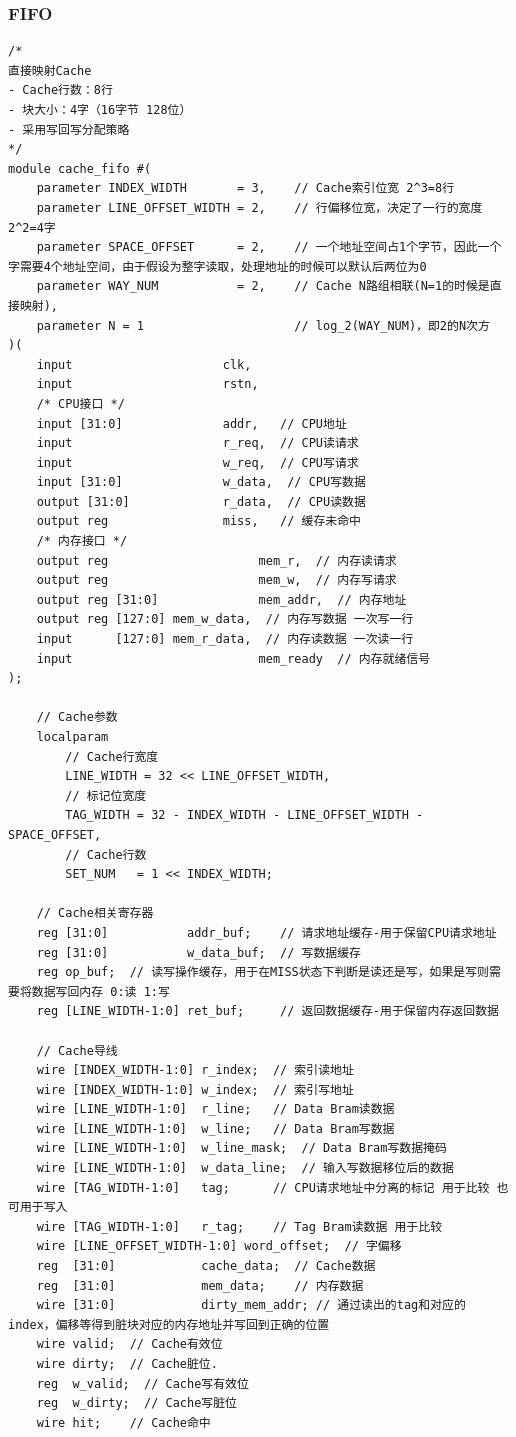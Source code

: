 \documentclass[12pt,a4paper]{ctexart}
\begin{document}
\subsubsection{FIFO}
\begin{lstlisting}[style=verilog]
/*
直接映射Cache
- Cache行数：8行
- 块大小：4字（16字节 128位）
- 采用写回写分配策略
*/
module cache_fifo #(
    parameter INDEX_WIDTH       = 3,    // Cache索引位宽 2^3=8行
    parameter LINE_OFFSET_WIDTH = 2,    // 行偏移位宽，决定了一行的宽度 2^2=4字
    parameter SPACE_OFFSET      = 2,    // 一个地址空间占1个字节，因此一个字需要4个地址空间，由于假设为整字读取，处理地址的时候可以默认后两位为0
    parameter WAY_NUM           = 2,    // Cache N路组相联(N=1的时候是直接映射),
    parameter N = 1                     // log_2(WAY_NUM)，即2的N次方
)(
    input                     clk,    
    input                     rstn,
    /* CPU接口 */  
    input [31:0]              addr,   // CPU地址
    input                     r_req,  // CPU读请求
    input                     w_req,  // CPU写请求
    input [31:0]              w_data,  // CPU写数据
    output [31:0]             r_data,  // CPU读数据
    output reg                miss,   // 缓存未命中
    /* 内存接口 */  
    output reg                     mem_r,  // 内存读请求
    output reg                     mem_w,  // 内存写请求
    output reg [31:0]              mem_addr,  // 内存地址
    output reg [127:0] mem_w_data,  // 内存写数据 一次写一行
    input      [127:0] mem_r_data,  // 内存读数据 一次读一行
    input                          mem_ready  // 内存就绪信号
);

    // Cache参数
    localparam
        // Cache行宽度
        LINE_WIDTH = 32 << LINE_OFFSET_WIDTH,
        // 标记位宽度
        TAG_WIDTH = 32 - INDEX_WIDTH - LINE_OFFSET_WIDTH - SPACE_OFFSET,
        // Cache行数
        SET_NUM   = 1 << INDEX_WIDTH;
    
    // Cache相关寄存器
    reg [31:0]           addr_buf;    // 请求地址缓存-用于保留CPU请求地址
    reg [31:0]           w_data_buf;  // 写数据缓存
    reg op_buf;  // 读写操作缓存，用于在MISS状态下判断是读还是写，如果是写则需要将数据写回内存 0:读 1:写
    reg [LINE_WIDTH-1:0] ret_buf;     // 返回数据缓存-用于保留内存返回数据

    // Cache导线
    wire [INDEX_WIDTH-1:0] r_index;  // 索引读地址
    wire [INDEX_WIDTH-1:0] w_index;  // 索引写地址
    wire [LINE_WIDTH-1:0]  r_line;   // Data Bram读数据
    wire [LINE_WIDTH-1:0]  w_line;   // Data Bram写数据
    wire [LINE_WIDTH-1:0]  w_line_mask;  // Data Bram写数据掩码
    wire [LINE_WIDTH-1:0]  w_data_line;  // 输入写数据移位后的数据
    wire [TAG_WIDTH-1:0]   tag;      // CPU请求地址中分离的标记 用于比较 也可用于写入
    wire [TAG_WIDTH-1:0]   r_tag;    // Tag Bram读数据 用于比较
    wire [LINE_OFFSET_WIDTH-1:0] word_offset;  // 字偏移
    reg  [31:0]            cache_data;  // Cache数据
    reg  [31:0]            mem_data;    // 内存数据
    wire [31:0]            dirty_mem_addr; // 通过读出的tag和对应的index，偏移等得到脏块对应的内存地址并写回到正确的位置
    wire valid;  // Cache有效位
    wire dirty;  // Cache脏位.
    reg  w_valid;  // Cache写有效位
    reg  w_dirty;  // Cache写脏位
    wire hit;    // Cache命中


\end{lstlisting}
\end{document}
